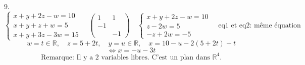 \documentclass{article}
\begin{document}
9.
\[
\begin{cases}
x + y + 2z - w = 10 \\
x + y + z + w = 5 \\
x + y + 3z - 3w = 15
\end{cases}
\quad
\begin{pmatrix}
1 & 1 \\
-1 &  \\
 & -1
\end{pmatrix}
\quad
\begin{cases}
x + y + 2z - w = 10 \\
z - 2w = 5 \\
-z + 2w = -5
\end{cases}
\quad \text{eq1 et eq2: même équation}
\]
\[
w = t \in \mathbb{R}, \quad z = 5 + 2t, \quad y = u \in \mathbb{R}, \quad x = 10 - u - 2(5 + 2t) + t
\]
\[
\Leftrightarrow x = -u - 3t
\]
\[
\text{Remarque: Il y a 2 variables libres. C'est un plan dans } \mathbb{R}^4.
\]
\end{document}
